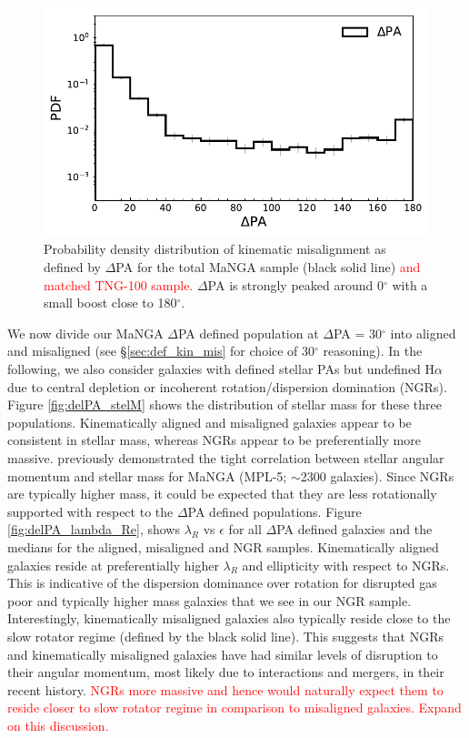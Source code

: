 \documentclass[fleqn,usenatbib]{mnras}
\newcommand{\red}[1]{{\textcolor{red}{#1}}}
\begin{document}
\begin{figure}
	\includegraphics[width=\linewidth]{total_pop/mpl8_pa_dist.pdf}
    \caption{Probability density distribution of kinematic misalignment as defined by $\Delta$PA for the total MaNGA sample (black solid line) \red{and matched TNG-100 sample.} $\Delta$PA is strongly peaked around 0$^{\circ}$ with a small boost close to 180$^{\circ}$.}
    \label{fig:total_pa_dist}
\end{figure}

We now divide our MaNGA $\Delta$PA defined population at $\Delta$PA = 30$^{\circ}$ into aligned and misaligned (see \S\ref{sec:def_kin_mis} for choice of 30$^{\circ}$ reasoning). In the following, we also consider galaxies with defined stellar PAs but undefined H$\alpha$ due to central depletion or incoherent rotation/dispersion domination (NGRs). Figure \ref{fig:delPA_stelM} shows the distribution of stellar mass for these three populations. Kinematically aligned and misaligned galaxies appear to be consistent in stellar mass, whereas NGRs appear to be preferentially more massive. \citet{graham2018} previously demonstrated the tight correlation between stellar angular momentum and stellar mass for MaNGA (MPL-5; $\sim$2300 galaxies). Since NGRs are typically higher mass, it could be expected that they are less rotationally supported with respect to the $\Delta$PA defined populations. Figure \ref{fig:delPA_lambda_Re}, shows $\lambda_R$ vs $\epsilon$ for all $\Delta$PA defined galaxies and the medians for the aligned, misaligned and NGR samples. Kinematically aligned galaxies reside at preferentially higher $\lambda_R$ and ellipticity with respect to NGRs. This is indicative of the dispersion dominance over rotation for disrupted gas poor and typically higher mass galaxies that we see in our NGR sample. Interestingly, kinematically misaligned galaxies also typically reside close to the slow rotator regime (defined by the black solid line). This suggests that NGRs and kinematically misaligned galaxies have had similar levels of disruption to their angular momentum, most likely due to interactions and mergers, in their recent history. \red{NGRs more massive and hence would naturally expect them to reside closer to slow rotator regime in comparison to misaligned galaxies. Expand on this discussion.}
\end{document}
